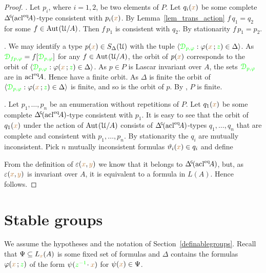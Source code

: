 \begin{proof}
  .
  Let $p_i$, where $i=1,2$, be two elements of $P$.
  Let $q_i({\color{brown} x})$ be some complete $\GDelta(\acl^\eq\!A)$-type consistent with $p_i({\color{brown} x})$.
  By Lemma~\ref{lem_trans_action} $f\,q_1=q_2$ for some $f\in{\rm Aut\kern.15ex}(\EuScript U/A)$.
  Then $f\,p_1$ is consistent with $q_2$.
  By stationarity $f\,p_1=p_2$.

  .
  We may identify a type $p({\color{brown} x})\in S_\Delta(\EuScript U)$ with the tuple $\langle{\color{green}\EuScript D_{p,\varphi}}:\varphi({\color{brown} x}\,;{\color{green} z})\in\Delta\rangle$.
  As ${\color{green}\EuScript D_{fp,\varphi}}=f[{\color{green}\EuScript D_{p,\varphi}}]$ for any $f\in{\rm Aut\kern.15ex}(\EuScript U/A)$, the orbit of $p({\color{brown} x})$ corresponds to the orbit of $\langle{\color{green}\EuScript D_{p,\varphi}}:\varphi({\color{brown} x}\,;{\color{green} z})\in\Delta\rangle$.
  As $p\in P$ is Lascar invariant over $A$, the sets ${\color{green}\EuScript D_{p,\varphi}}$ are in ${\rm acl}^{{\rm eq}}\!A$.
  Hence have a finite orbit.
  As $\Delta$ is finite the orbit of $\langle{\color{green}\EuScript D_{p,\varphi}}:\varphi({\color{brown} x}\,;{\color{green} z})\in\Delta\rangle$ is finite, and so is the orbit of $p$.
  By , $P$ is finite.

  . 
  Let $p_1,\dots,p_n$ be an enumeration without repetitions of $P$.
  Let $q_1({\color{brown} x})$ be some complete $\GDelta(\acl^\eq\!A)$-type consistent with $p_1$.
  It is easy to see that the orbit of $q_1({\color{brown} x})$ under the action of ${\rm Aut\kern.15ex}(\EuScript U/A)$ consists of $\GDelta(\acl^\eq\!A)$-types $q_1,\dots,q_n$ that are complete and consistent with $p_1,\dots,p_n$.
  By stationarity the $q_i$ are mutually inconsistent.
  Pick $n$ mutually inconsistent formulas $\vartheta_i({\color{brown} x})\in q_i$ and define

  
  From the definition of $\varepsilon({\color{brown} x},{\color{brown} y})$ we know that it belongs to $\GDelta(\acl^\eq\!A)$, but, as $\varepsilon({\color{brown} x},{\color{brown} y})$ is invariant over $A$, it is equivalent to a formula in $L(A)$.
  Hence  follows.
\end{proof}

\section{Stable groups}\label{stable_groups}

We assume the hypotheses and the notation of Section~\ref{definablegroups}.
Recall that $\Psi\subseteq L_{\color{brown} x}(A)$ is some fixed set of formulas and \emph{$\Delta$\/} contains the formulas $\varphi({\color{brown} x}\,;{\color{green} z})$ of the form  $\psi({\color{green} z^{-1}}\!\cdot{\color{brown}x})$ for $\psi({\color{brown} x})\in\Psi$.

